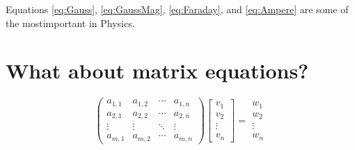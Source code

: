 \documentclass{article}
\begin{document}
    Equations \ref{eq:Gauss}, \ref{eq:GaussMag}, \ref{eq:Faraday}, and \ref{eq:Ampere} are some of the mostimportant in Physics.

    \section{What about matrix equations?}
    \[   
        \begin{pmatrix}                                                 %
            a_{1,1} & a_{1,2} & \cdots & a_{1,n} \\ 
            a_{2,1} & a_{2,2} & \cdots & a_{2,n} \\ 
            \vdots & \vdots & \ddots & \vdots \\ 
            a_{m,1} & a_{m,2} & \cdots & a_{m,n}
        \end{pmatrix}
        \begin{bmatrix}                                                 %
            v_1 \\
            v_2 \\
            \vdots \\
            v_n
        \end{bmatrix}
        =
        \begin{matrix}                                                  %
            w_1 \\
            w_2 \\
            \vdots \\
            w_n
        \end{matrix}
    \]
        
\end{document}
